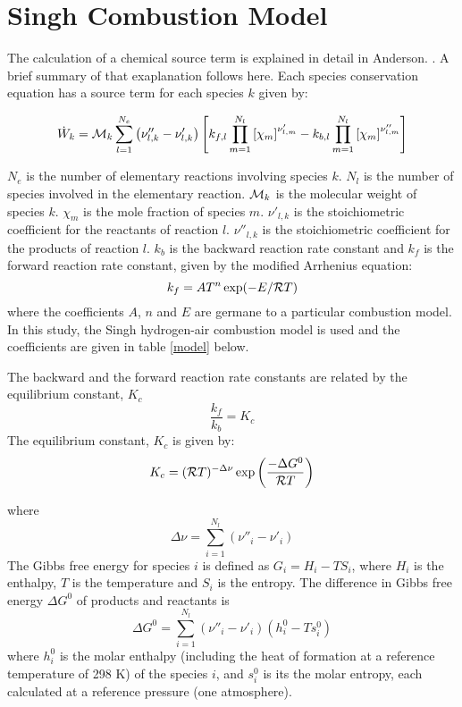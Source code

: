 \section{Singh Combustion Model}

The calculation of a chemical source term is explained in detail in Anderson. \cite{gen:anderson2}.
A brief summary of that exaplanation follows here.
Each species conservation equation has a source term for each species $k$ given by:

\begin{displaymath}
\dot{W}_k = {\cal M}_k \sum_{l=1}^{N_e} \left( \nu''_{l,k} - \nu'_{l,k} \right)
\left[ k_{f,l} \prod_{m=1}^{N_l} \left[ \chi_m \right]^{\nu'_{l,m}}
- k_{b,l} \prod_{m=1}^{N_l} \left[ \chi_m \right]^{\nu''_{l,m}} \right]
\end{displaymath}

$N_e$ is the number of elementary reactions involving species $k$.
$N_l$ is the number of species involved in the elementary reaction.
${\cal M}_k$ is the molecular weight of species $k$.
$\chi_m$ is the mole fraction of species $m$.
$\nu'_{l,k}$ is the stoichiometric coefficient for the reactants of reaction $l$.
$\nu''_{l,k}$ is the stoichiometric coefficient for the products of reaction $l$.
$k_b$ is the backward reaction rate constant and
$k_f$ is the forward reaction rate constant, given by the
modified Arrhenius equation:
\begin{displaymath}
k_f = AT^n \exp(-E/{\cal R}T)
\end{displaymath}
where the coefficients $A$, $n$ and $E$ are germane to a particular combustion
model. In this study, the Singh hydrogen-air combustion model is used 
\cite{chem:singh} and the coefficients are given in table \ref{model} 
below.

The backward and the forward reaction rate constants are related by the
equilibrium constant, $K_c$
\begin{displaymath}
\frac{k_f}{k_b} = K_c
\end{displaymath}
The equilibrium constant, $K_c$ is given by:
\begin{displaymath}
K_c = ({\cal R} T)^{-\Delta \nu}
       \exp \left( \frac{-\Delta G^0}{{\cal R} T} \right)
\end{displaymath}

where
\begin{displaymath}
\Delta \nu = \sum_{i=1}^{N_l} (\nu''_i - \nu'_i)
\end{displaymath}
The Gibbs free energy for species $i$
is defined as $G_i = H_i - T S_i$, where $H_i$ is the
enthalpy, $T$ is the temperature and $S_i$ is the entropy.
The difference in Gibbs free energy $\Delta G^0$ of products and reactants is
\begin{displaymath}
\Delta G^0 = \sum_{i=1}^{N_l} (\nu''_i - \nu'_i) \left( h^0_i - T s^0_i \right)
\end{displaymath}
where $h^0_i$ is the molar enthalpy (including the heat of formation at a
reference temperature of 298 K)
of the species $i$, and $s^0_i$ is its the molar entropy,
each calculated at a reference pressure (one atmosphere).\\
\\

